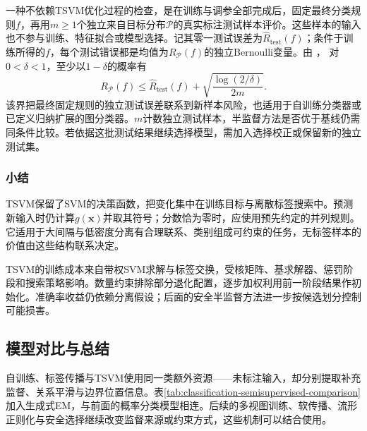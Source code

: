 一种不依赖TSVM优化过程的检查，是在训练与调参全部完成后，固定最终分类规则$f$，再用$m\geq1$个独立来自目标分布$\mathcal{P}$的真实标注测试样本评价。这些样本的输入也不参与训练、特征拟合或模型选择。记其零一测试误差为$\widehat R_{\mathrm{test}}(f)$；条件于训练所得的$f$，每个测试错误都是均值为$R_{\mathcal{P}}(f)$的独立Bernoulli变量。由
，
对$0<\delta<1$，至少以$1-\delta$的概率有
\begin{equation}
  \label{eq:classification-semisupervised-test-risk}
  R_{\mathcal{P}}(f)
    \leq\widehat R_{\mathrm{test}}(f)
       +\sqrt{\frac{\log(2/\delta)}{2m}}.
\end{equation}
该界把最终固定规则的独立测试误差联系到新样本风险，也适用于自训练分类器或已定义归纳扩展的图分类器。$m$计数独立测试样本，半监督方法是否优于基线仍需同条件比较。若依据这批测试结果继续选择模型，需加入选择校正或保留新的独立测试集。

\subsubsection{小结}
\label{sec:classification-tsvm-summary}

TSVM保留了SVM的决策函数，把变化集中在训练目标与离散标签搜索中。预测新输入时仍计算$g(\bm{x})$并取其符号；分数恰为零时，应使用预先约定的并列规则。它适用于大间隔与低密度分离有合理联系、类别组成可约束的任务，无标签样本的价值由这些结构联系决定。

TSVM的训练成本来自带权SVM求解与标签交换，受核矩阵、基求解器、惩罚阶段和搜索策略影响。数量约束排除部分退化配置，逐步加权利用前一阶段结果作初始化。准确率收益仍依赖分离假设；后面的安全半监督方法进一步按候选划分控制可能损害。

\subsection{模型对比与总结}
\label{sec:classification-semisupervised-comparison}

自训练、标签传播与TSVM使用同一类额外资源——未标注输入，却分别提取补充监督、关系平滑与边界位置信息。表\ref{tab:classification-semisupervised-comparison}加入生成式EM，与前面的概率分类模型相连。后续的多视图训练、软传播、流形正则化与安全选择继续改变监督来源或约束方式，这些机制可以结合使用。

